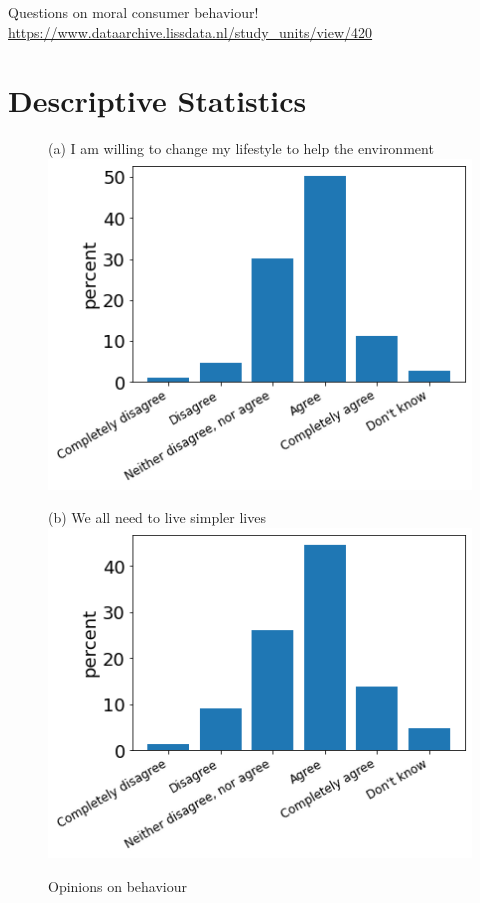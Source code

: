 \documentclass[12pt]{article}
\begin{document}
Questions on moral consumer behaviour! 
\url{https://www.dataarchive.lissdata.nl/study_units/view/420}


\section{Descriptive Statistics}

\begin{figure}[h!!]
	\centering	
	\caption{Opinions on behaviour}\label{fig:opinions}	
	\begin{minipage}[h!!]{0.32\textwidth}  
		\centering\footnotesize{(a) I am willing to change my lifestyle to help the environment}
		\includegraphics[width=1\textwidth]{../codding_data/results/liss/qk20a175title0.png}
	\end{minipage}
	\begin{minipage}[h!!]{0.32\textwidth}
		\centering\footnotesize{(b) We all need to live simpler lives}
		\includegraphics[width=1\textwidth]{../codding_data/results/liss/qk20a181title0.png}

\end{minipage}
\end{figure}
\end{document}
